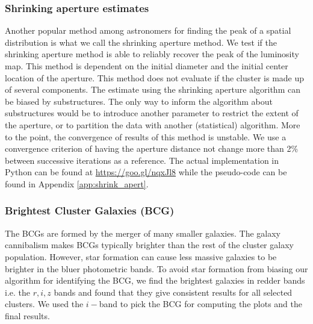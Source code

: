 \subsubsection{Shrinking aperture estimates}

Another popular method among astronomers for finding the peak of a spatial
distribution is what we call the shrinking aperture method.
We test if the shrinking aperture method is able to reliably recover the 
peak of the luminosity map.
This method is dependent on the initial diameter and the initial center 
location of the aperture.
This method does not evaluate if the cluster is made up of
several components.
The estimate using the shrinking aperture algorithm can be biased by
substructures. The only way to inform the algorithm about substructures would
be to introduce another parameter to restrict the extent of the aperture, or to
partition the data with another (statistical) algorithm.
More to the point, the convergence of results of this method is unstable. We use a
convergence criterion of having the aperture distance not change more than 2\% 
between successive iterations as a reference. The actual implementation in
{\sc Python} can be found at \href{https://goo.gl/nqxJl8}{https://goo.gl/nqxJl8} while
the pseudo-code can be found in Appendix \ref{app:shrink_apert}.

\subsubsection{Brightest Cluster Galaxies (BCG)}
The BCGs are formed by the merger of many smaller
galaxies. The galaxy cannibalism makes BCGs typically brighter than the rest of 
the cluster galaxy population. 
However, star formation can cause
less massive galaxies to be brighter in the bluer photometric bands.
To avoid star formation from biasing our algorithm for identifying the
BCG, we find the brightest galaxies in redder bands i.e. the $r, i, z$
bands and found that they give consistent results for all selected clusters. 
We used the $i-$band to pick the BCG for computing the plots and the final results. 
 
